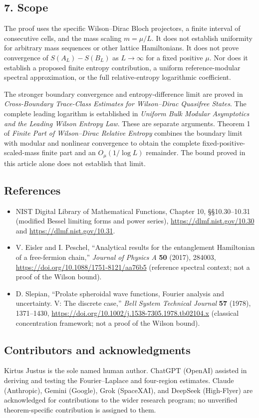 \documentclass[
  10pt,
  a4paper,
]{article}
\providecommand{\tightlist}{%
  \setlength{\itemsep}{0pt}\setlength{\parskip}{0pt}}
\begin{document}
\subsection{7. Scope}\label{scope}

The proof uses the specific Wilson--Dirac Bloch projectors, a finite interval of consecutive cells, and the mass scaling \(m=\mu/L\). It does not establish uniformity for arbitrary mass sequences or other lattice Hamiltonians. It does not prove convergence of \(S(A_L)-S(B_L)\) as \(L\to\infty\) for a fixed positive \(\mu\). Nor does it establish a proposed finite entropy contribution, a uniform reference-modular spectral approximation, or the full relative-entropy logarithmic coefficient.

The stronger boundary convergence and entropy-difference limit are proved in \emph{Cross-Boundary Trace-Class Estimates for Wilson--Dirac Quasifree States}. The complete leading logarithm is established in \emph{Uniform Bulk Modular Asymptotics and the Leading Wilson Entropy Law}. These are separate arguments. Theorem 1 of \emph{Finite Part of Wilson--Dirac Relative Entropy} combines the boundary limit with modular and nonlinear convergence to obtain the complete fixed-positive-scaled-mass finite part and an \(O_\mu(1/\log L)\) remainder. The bound proved in this article alone does not establish that limit.

\subsection{References}\label{references}

\begin{itemize}
\tightlist
\item
  NIST Digital Library of Mathematical Functions, Chapter 10, §§10.30--10.31 (modified Bessel limiting forms and power series), \url{https://dlmf.nist.gov/10.30} and \url{https://dlmf.nist.gov/10.31}.
\item
  V. Eisler and I. Peschel, ``Analytical results for the entanglement Hamiltonian of a free-fermion chain,'' \emph{Journal of Physics A} \textbf{50} (2017), 284003, \url{https://doi.org/10.1088/1751-8121/aa76b5} (reference spectral context; not a proof of the Wilson bound).
\item
  D. Slepian, ``Prolate spheroidal wave functions, Fourier analysis and uncertainty. V: The discrete case,'' \emph{Bell System Technical Journal} \textbf{57} (1978), 1371--1430, \url{https://doi.org/10.1002/j.1538-7305.1978.tb02104.x} (classical concentration framework; not a proof of the Wilson bound).
\end{itemize}

\subsection{Contributors and acknowledgments}\label{contributors-and-acknowledgments}

Kirtus Justus is the sole named human author. ChatGPT (OpenAI) assisted in deriving and testing the Fourier--Laplace and four-region estimates. Claude (Anthropic), Gemini (Google), Grok (SpaceXAI), and DeepSeek (High-Flyer) are acknowledged for contributions to the wider research program; no unverified theorem-specific contribution is assigned to them.
\end{document}
